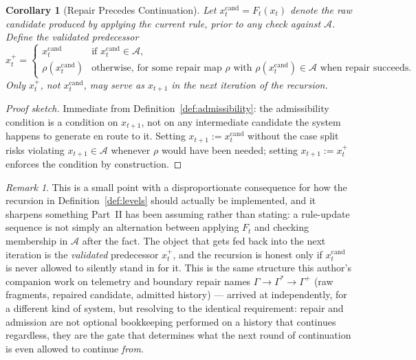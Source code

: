 \documentclass[12pt,a4paper]{article}
\theoremstyle{plain}
\newtheorem{corollary}[theorem]{Corollary}
\theoremstyle{definition}
\theoremstyle{remark}
\newtheorem{remark}[theorem]{Remark}
\newcommand{\Adm}{\mathcal{A}}
\begin{document}
\begin{corollary}[Repair Precedes Continuation]
\label{cor:repair-precedes-continuation}
Let $x_t^{\mathrm{cand}} = F_t(x_t)$ denote the raw candidate produced by applying the current rule, prior to any check against $\Adm$. Define the \emph{validated predecessor}
\[
x_t^{+} =
\begin{cases}
x_t^{\mathrm{cand}} & \text{if } x_t^{\mathrm{cand}} \in \Adm, \\
\rho(x_t^{\mathrm{cand}}) & \text{otherwise, for some repair map } \rho \text{ with } \rho(x_t^{\mathrm{cand}}) \in \Adm \text{ when repair succeeds.}
\end{cases}
\]
Only $x_t^{+}$, not $x_t^{\mathrm{cand}}$, may serve as $x_{t+1}$ in the next iteration of the recursion.
\end{corollary}

\begin{proof}[Proof sketch]
Immediate from Definition~\ref{def:admissibility}: the admissibility condition is a condition on $x_{t+1}$, not on any intermediate candidate the system happens to generate en route to it. Setting $x_{t+1} := x_t^{\mathrm{cand}}$ without the case split risks violating $x_{t+1}\in\Adm$ whenever $\rho$ would have been needed; setting $x_{t+1} := x_t^{+}$ enforces the condition by construction.
\end{proof}

\begin{remark}
This is a small point with a disproportionate consequence for how the recursion in Definition~\ref{def:levels} should actually be implemented, and it sharpens something Part~II has been assuming rather than stating: a rule-update sequence is not simply an alternation between applying $F_t$ and checking membership in $\Adm$ after the fact. The object that gets fed back into the next iteration is the \emph{validated} predecessor $x_t^+$, and the recursion is honest only if $x_t^{\mathrm{cand}}$ is never allowed to silently stand in for it. This is the same structure this author's companion work on telemetry and boundary repair names $\Gamma \to \Gamma^* \to \Gamma^+$ (raw fragments, repaired candidate, admitted history) — arrived at independently, for a different kind of system, but resolving to the identical requirement: repair and admission are not optional bookkeeping performed on a history that continues regardless, they are the gate that determines what the next round of continuation is even allowed to continue \emph{from}.
\end{remark}
\end{document}
